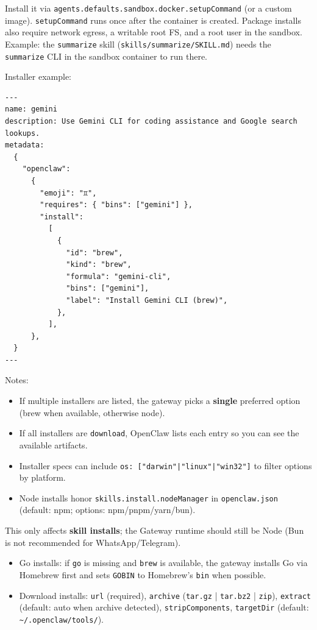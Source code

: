 Install it via \texttt{agents.defaults.sandbox.docker.setupCommand} (or a custom image).
\texttt{setupCommand} runs once after the container is created.
Package installs also require network egress, a writable root FS, and a root user in the sandbox.
Example: the \texttt{summarize} skill (\texttt{skills/summarize/SKILL.md}) needs the \texttt{summarize} CLI
in the sandbox container to run there.

Installer example:

\begin{lstlisting}
---
name: gemini
description: Use Gemini CLI for coding assistance and Google search lookups.
metadata:
  {
    "openclaw":
      {
        "emoji": "♊️",
        "requires": { "bins": ["gemini"] },
        "install":
          [
            {
              "id": "brew",
              "kind": "brew",
              "formula": "gemini-cli",
              "bins": ["gemini"],
              "label": "Install Gemini CLI (brew)",
            },
          ],
      },
  }
---
\end{lstlisting}


Notes:

\begin{itemize}
  \item If multiple installers are listed, the gateway picks a \textbf{single} preferred option (brew when available, otherwise node).
  \item If all installers are \texttt{download}, OpenClaw lists each entry so you can see the available artifacts.
  \item Installer specs can include \texttt{os: ["darwin"|"linux"|"win32"]} to filter options by platform.
  \item Node installs honor \texttt{skills.install.nodeManager} in \texttt{openclaw.json} (default: npm; options: npm/pnpm/yarn/bun).
\end{itemize}

This only affects \textbf{skill installs}; the Gateway runtime should still be Node
(Bun is not recommended for WhatsApp/Telegram).
\begin{itemize}
  \item Go installs: if \texttt{go} is missing and \texttt{brew} is available, the gateway installs Go via Homebrew first and sets \texttt{GOBIN} to Homebrew’s \texttt{bin} when possible.
  \item Download installs: \texttt{url} (required), \texttt{archive} (\texttt{tar.gz} | \texttt{tar.bz2} | \texttt{zip}), \texttt{extract} (default: auto when archive detected), \texttt{stripComponents}, \texttt{targetDir} (default: \texttt{\textasciitilde{}/.openclaw/tools/}).
\end{itemize}


